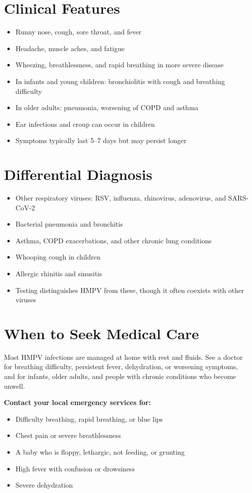 \section*{Clinical Features}
\begin{itemize}
    \item Runny nose, cough, sore throat, and fever
    \item Headache, muscle aches, and fatigue
    \item Wheezing, breathlessness, and rapid breathing in more severe disease
    \item In infants and young children: bronchiolitis with cough and breathing difficulty
    \item In older adults: pneumonia, worsening of COPD and asthma
    \item Ear infections and croup can occur in children
    \item Symptoms typically last 5--7 days but may persist longer
\end{itemize}

\section*{Differential Diagnosis}
\begin{itemize}
    \item Other respiratory viruses: RSV, influenza, rhinovirus, adenovirus, and SARS-CoV-2
    \item Bacterial pneumonia and bronchitis
    \item Asthma, COPD exacerbations, and other chronic lung conditions
    \item Whooping cough in children
    \item Allergic rhinitis and sinusitis
    \item Testing distinguishes HMPV from these, though it often coexists with other viruses
\end{itemize}

\section*{When to Seek Medical Care}
Most HMPV infections are managed at home with rest and fluids. See a doctor for breathing difficulty, persistent fever, dehydration, or worsening symptoms, and for infants, older adults, and people with chronic conditions who become unwell.

\textbf{Contact your local emergency services for:}
\begin{itemize}
    \item Difficulty breathing, rapid breathing, or blue lips
    \item Chest pain or severe breathlessness
    \item A baby who is floppy, lethargic, not feeding, or grunting
    \item High fever with confusion or drowsiness
    \item Severe dehydration
\end{itemize}

